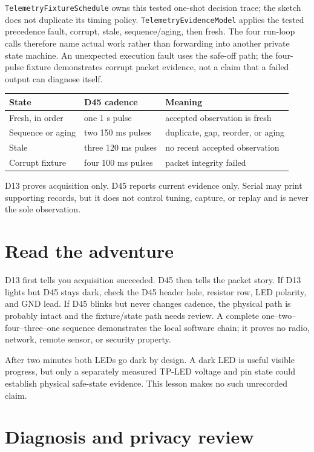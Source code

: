 \documentclass[11pt]{article}
\begin{document}
\texttt{TelemetryFixtureSchedule} owns this tested one-shot decision trace; the
sketch does not duplicate its timing policy. \texttt{TelemetryEvidenceModel}
applies the tested precedence fault, corrupt, stale, sequence/aging, then
fresh. The four run-loop calls therefore name actual work rather than
forwarding into another private state machine. An unexpected execution fault
uses the safe-off path; the four-pulse fixture demonstrates corrupt packet
evidence, not a claim that a failed output can diagnose itself.

\begin{tabularx}{\linewidth}{@{}l l X@{}}
\toprule
State & D45 cadence & Meaning\\
\midrule
Fresh, in order & one 1 s pulse & accepted observation is fresh\\
Sequence or aging & two 150 ms pulses & duplicate, gap, reorder, or aging\\
Stale & three 120 ms pulses & no recent accepted observation\\
Corrupt fixture & four 100 ms pulses & packet integrity failed\\
\bottomrule
\end{tabularx}

D13 proves acquisition only. D45 reports current evidence only. Serial may
print supporting records, but it does not control tuning, capture, or replay
and is never the sole observation.

\section{Read the adventure}

D13 first tells you acquisition succeeded. D45 then tells the packet story.
If D13 lights but D45 stays dark, check the D45 header hole, resistor row, LED
polarity, and GND lead. If D45 blinks but never changes cadence, the physical
path is probably intact and the fixture/state path needs review. A complete
one--two--four--three--one sequence demonstrates the local software chain; it
proves no radio, network, remote sensor, or security property.

After two minutes both LEDs go dark by design. A dark LED is useful visible
progress, but only a separately measured TP-LED voltage and pin state could
establish physical safe-state evidence. This lesson makes no such unrecorded
claim.

\section{Diagnosis and privacy review}
\end{document}
